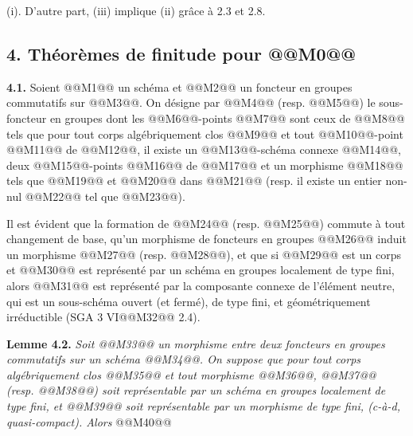 
(i). D'autre part, (iii) implique (ii) gr\^ace \`a 2.3 et 2.8.

\subsection*{4. Th\'eor\`emes de finitude pour @@M0@@}

\textbf{4.1.} Soient @@M1@@ un sch\'ema et @@M2@@ un foncteur en groupes commutatifs sur @@M3@@. On d\'esigne par @@M4@@ (resp. @@M5@@) le sous-foncteur en groupes dont les @@M6@@-points @@M7@@ sont ceux de @@M8@@ tels que pour tout corps alg\'ebriquement clos @@M9@@ et tout @@M10@@-point @@M11@@ de @@M12@@, il existe un @@M13@@-sch\'ema connexe @@M14@@, deux @@M15@@-points @@M16@@ de @@M17@@ et un morphisme @@M18@@ tels que @@M19@@ et @@M20@@ dans @@M21@@ (resp. il existe un entier non-nul @@M22@@ tel que @@M23@@).

Il est \'evident que la formation de @@M24@@ (resp. @@M25@@) commute \`a tout changement de base, qu'un morphisme de foncteurs en groupes @@M26@@ induit un morphisme @@M27@@ (resp. @@M28@@), et que si @@M29@@ est un corps et @@M30@@ est repr\'esent\'e par un sch\'ema en groupes localement de type fini, alors @@M31@@ est repr\'esent\'e par la composante connexe de l'\'el\'ement neutre, qui est un sous-sch\'ema ouvert (et ferm\'e), de type fini, et g\'eom\'etriquement irr\'eductible (SGA 3 VI@@M32@@ 2.4).

\textbf{Lemme 4.2.} \emph{Soit @@M33@@ un morphisme entre deux foncteurs en groupes commutatifs sur un sch\'ema @@M34@@. On suppose que pour tout corps alg\'ebriquement clos @@M35@@ et tout morphisme @@M36@@, @@M37@@ (resp. @@M38@@) soit repr\'esentable par un sch\'ema en groupes localement de type fini, et @@M39@@ soit repr\'esentable par un morphisme de type fini, (c-\`a-d, quasi-compact). Alors}
@@M40@@

